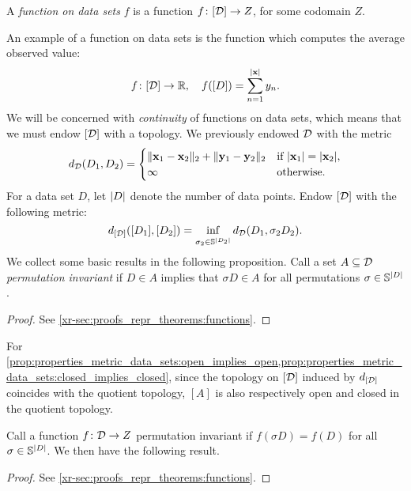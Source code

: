 \documentclass[12pt, twoside]{report}
\newcommand{\xrprefix}[1]{xr-#1}
\begin{document}
\begin{definition}
    A \emph{function on data sets} $f$ is a function $f\colon[\mathcal{D}] \to Z$, for some codomain $Z$.
\end{definition}

An example of a function on data sets is the function which computes the average observed value:
\begin{equation}
    f\colon [\mathcal{D}] \to \mathbb{R}, \quad
    f([D]) = \sum_{n=1}^{\lvert\mathbf{x}\rvert} y_n.
\end{equation}
We will be concerned with \emph{continuity} of functions on data sets, which means that we must endow $[\mathcal{D}]$ with a topology.
We previously endowed $\mathcal{D}$ with the metric
\begin{equation}
    d_{\mathcal{D}}(D_1, D_2) = \begin{cases}
        \lVert\mathbf{x}_1 - \mathbf{x}_2\rVert_2 + \lVert\mathbf{y}_1 - \mathbf{y}_2\rVert_2 & \text{if $\lvert\mathbf{x}_1\rvert = \lvert\mathbf{x}_2\rvert$}, \\
        \infty & \text{otherwise}.
    \end{cases}
\end{equation}
For a data set $D$, let $\lvert D\rvert$ denote the number of data points.
Endow $[\mathcal{D}]$ with the following metric:
\begin{equation} \label{eq:metric_data_sets_infimum}
    d_{[\D]}([D_1], [D_2]) = \inf_{\sigma_2 \in \Sb^{\abs{D_2}}} d_\D(D_1, \sigma_2 D_2).
\end{equation}
We collect some basic results in the following proposition.
Call a set $A \subseteq \mathcal{D}$ \emph{permutation invariant} if $D \in A$ implies that $\sigma D \in A$ for all permutations $\sigma \in \mathbb{S}^{\lvert D\rvert}$.

\begin{proof}
    See \cref{\xrprefix{sec:proofs_repr_theorems:functions}}.
\end{proof}

For \cref{prop:properties_metric_data_sets:open_implies_open,prop:properties_metric_data_sets:closed_implies_closed},
since the topology on $[\mathcal{D}]$ induced by $d_{[\mathcal{D}]}$ coincides with the quotient topology, $[A]$ is also respectively open and closed in the quotient topology.

Call a function $f\colon\mathcal{D}  \to Z$ permutation invariant if $f(\sigma D) = f(D)$ for all $\sigma \in \mathbb{S}^{\lvert D\rvert}$.
We then have the following result.

\begin{proof}
    See \cref{\xrprefix{sec:proofs_repr_theorems:functions}}.
\end{proof}
\end{document}
